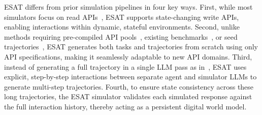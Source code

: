 \textsc{ESAT} differs from prior simulation pipelines in four key ways. First, while most simulators focus on read APIs~\citep{toolalpaca, stabletoolbench}, \textsc{ESAT} supports state-changing write APIs, enabling interactions within dynamic, stateful environments. Second, unlike methods requiring pre-compiled API pools~\citep{toolace}, existing benchmarks~\citep{chandiramani2026nemotron}, or seed trajectories~\citep{li2025simulating}, \textsc{ESAT} generates both tasks and trajectories from scratch using only API specifications, making it seamlessly adaptable to new API domains. Third, instead of generating a full trajectory in a single LLM pass as in~\citet{li2025simulating}, \textsc{ESAT} uses explicit, step-by-step interactions between separate agent and simulator LLMs to generate multi-step trajectories. Fourth, to ensure state consistency across these long trajectories, the \textsc{ESAT} simulator validates each simulated response against the full interaction history, thereby acting as a persistent digital world model.